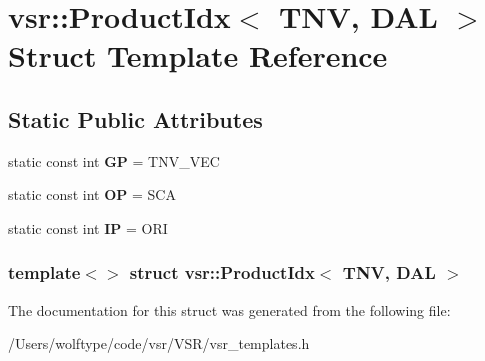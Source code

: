 \hypertarget{structvsr_1_1_product_idx_3_01_t_n_v_00_01_d_a_l_01_4}{\section{vsr\-:\-:Product\-Idx$<$ T\-N\-V, D\-A\-L $>$ Struct Template Reference}
\label{structvsr_1_1_product_idx_3_01_t_n_v_00_01_d_a_l_01_4}
}
\subsection*{Static Public Attributes}
\begin{DoxyCompactItemize}
\item 
\hypertarget{structvsr_1_1_product_idx_3_01_t_n_v_00_01_d_a_l_01_4_a4cf56c5526f2ca81ef987bf881ed56ef}{static const int {\bfseries G\-P} = T\-N\-V\-\_\-\-V\-E\-C}\label{structvsr_1_1_product_idx_3_01_t_n_v_00_01_d_a_l_01_4_a4cf56c5526f2ca81ef987bf881ed56ef}

\item 
\hypertarget{structvsr_1_1_product_idx_3_01_t_n_v_00_01_d_a_l_01_4_aafb54bbd09e9070ce27fd151db76d1ff}{static const int {\bfseries O\-P} = S\-C\-A}\label{structvsr_1_1_product_idx_3_01_t_n_v_00_01_d_a_l_01_4_aafb54bbd09e9070ce27fd151db76d1ff}

\item 
\hypertarget{structvsr_1_1_product_idx_3_01_t_n_v_00_01_d_a_l_01_4_a53a600d47d5a4d5e8431759b624c6f6f}{static const int {\bfseries I\-P} = O\-R\-I}\label{structvsr_1_1_product_idx_3_01_t_n_v_00_01_d_a_l_01_4_a53a600d47d5a4d5e8431759b624c6f6f}

\end{DoxyCompactItemize}
\subsubsection*{template$<$$>$ struct vsr\-::\-Product\-Idx$<$ T\-N\-V, D\-A\-L $>$}



The documentation for this struct was generated from the following file\-:\begin{DoxyCompactItemize}
\item 
/\-Users/wolftype/code/vsr/\-V\-S\-R/vsr\-\_\-templates.\-h\end{DoxyCompactItemize}
